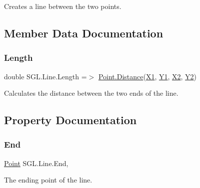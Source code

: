 Creates a line between the two points. 



\subsection{Member Data Documentation}
\mbox{\label{class_s_g_l_1_1_line_a58ee417f43a6acd3b7c4f00c190c26fa}} 
\subsubsection{\texorpdfstring{Length}{Length}}
{\footnotesize\ttfamily double S\+G\+L.\+Line.\+Length =$>$ \mbox{\hyperlink{struct_s_g_l_1_1_point_a88dc45979fe8192615705469fc12f18b}{Point.\+Distance}}(\mbox{\hyperlink{class_s_g_l_1_1_line_a4485492024fc96d2db3aa34d699f974e}{X1}}, \mbox{\hyperlink{class_s_g_l_1_1_line_a1875f7240fd5be5323aaef118c9308c0}{Y1}}, \mbox{\hyperlink{class_s_g_l_1_1_line_ab6dcb09fcf8983e99c5230d4321bbfc8}{X2}}, \mbox{\hyperlink{class_s_g_l_1_1_line_af3571b932c09f78f70e288770e266341}{Y2}})}



Calculates the distance between the two ends of the line. 



\subsection{Property Documentation}
\mbox{\label{class_s_g_l_1_1_line_a6b6a840b2b8ce27ed017946da182a10e}} 
\subsubsection{\texorpdfstring{End}{End}}
{\footnotesize\ttfamily \mbox{\hyperlink{struct_s_g_l_1_1_point}{Point}} S\+G\+L.\+Line.\+End\hspace{0.3cm}{\ttfamily [get]}, {\ttfamily [set]}}



The ending point of the line. 

\mbox{\label{class_s_g_l_1_1_line_ad062108c742ed94352ffbd24153e7125}} 
